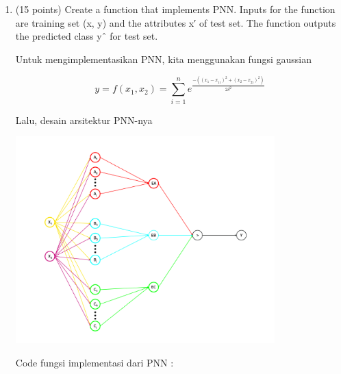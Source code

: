 \documentclass[12pt]{article}%
\begin{document}
\begin{enumerate}
\begin{enumerate}
		\item (15 points) Create a function that implements PNN. Inputs for the function are training set (x, y) and the attributes x′ of test set. The function outputs the predicted class yˆ for test set.

		\par Untuk mengimplementasikan PNN, kita menggunakan fungsi gaussian

		\[y = f(x_1,x_2) = \sum_{i=1}^{n} e^{\frac{-\left ( \left ( x_1-x_{1i} \right )^2+ \left ( x_2 - x_{2i} \right )^2\right ) }{2\delta^2}}\]

		\par Lalu, desain arsitektur PNN-nya 

		\par \includegraphics[width=10cm]{ass2clo3no19_3} 

		\par Code fungsi implementasi dari PNN :


\end{enumerate}
\end{enumerate}
\end{document}
